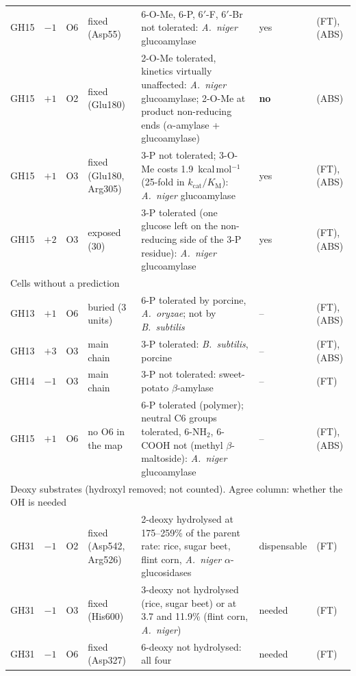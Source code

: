 \documentclass[preprint,12pt]{elsarticle}
\begin{document}
\begin{landscape}
{\begin{longtable}{lllp{3.3cm}p{6.8cm}lp{3.8cm}}
GH15 & $-1$ & O6 & fixed (Asp55) & 6-O-Me, 6-P, 6$'$-F, 6$'$-Br not tolerated: \emph{A.~niger} glucoamylase & yes & \citep{Takeda1987,Bock1988} (FT), \citep{Lemieux1996,Abe1982} (ABS)\\
GH15 & $+1$ & O2 & fixed (Glu180) & 2-O-Me tolerated, kinetics virtually unaffected: \emph{A.~niger} glucoamylase; 2-O-Me at product non-reducing ends ($\alpha$-amylase + glucoamylase) & \textbf{no} & \citep{Lemieux1996,Mischnick2001} (ABS)\\
GH15 & $+1$ & O3 & fixed (Glu180, Arg305) & 3-P not tolerated; 3-O-Me costs 1.9~kcal\,mol$^{-1}$ (25-fold in $k_\mathrm{cat}/K_\mathrm{M}$): \emph{A.~niger} glucoamylase & yes & \citep{Takeda1987} (FT), \citep{Takeda1983,Kamasaka1997,Lemieux1996} (ABS)\\
GH15 & $+2$ & O3 & exposed (30) & 3-P tolerated (one glucose left on the non-reducing side of the 3-P residue): \emph{A.~niger} glucoamylase & yes & \citep{Takeda1987} (FT), \citep{Takeda1983} (ABS)\\
\midrule
\multicolumn{7}{l}{Cells without a prediction}\\
GH13 & $+1$ & O6 & buried (3 units) & 6-P tolerated by porcine, \emph{A.~oryzae}; not by \emph{B.~subtilis} & -- & \citep{Takeda1987} (FT), \citep{Takeda1983} (ABS)\\
GH13 & $+3$ & O3 & main chain & 3-P tolerated: \emph{B.~subtilis}, porcine & -- & \citep{Takeda1987} (FT), \citep{Takeda1983} (ABS)\\
GH14 & $-1$ & O3 & main chain & 3-P not tolerated: sweet-potato $\beta$-amylase & -- & \citep{Takeda1987} (FT)\\
GH15 & $+1$ & O6 & no O6 in the map & 6-P tolerated (polymer); neutral C6 groups tolerated, 6-NH$_2$, 6-COOH not (methyl $\beta$-maltoside): \emph{A.~niger} glucoamylase & -- & \citep{Takeda1987,Bock1988} (FT), \citep{Takeda1983,Abe1982} (ABS)\\
\midrule
\multicolumn{7}{l}{Deoxy substrates (hydroxyl removed; not counted). Agree column: whether the OH is needed}\\
GH31 & $-1$ & O2 & fixed (Asp542, Arg526) & 2-deoxy hydrolysed at 175--259\% of the parent rate: rice, sugar beet, flint corn, \emph{A.~niger} $\alpha$-glucosidases & dispensable & \citep{Nishio2002,Ogawa2004} (FT)\\
GH31 & $-1$ & O3 & fixed (His600) & 3-deoxy not hydrolysed (rice, sugar beet) or at 3.7 and 11.9\% (flint corn, \emph{A.~niger}) & needed & \citep{Nishio2002} (FT)\\
GH31 & $-1$ & O6 & fixed (Asp327) & 6-deoxy not hydrolysed: all four & needed & \citep{Nishio2002,Ogawa2004} (FT)\\

\end{longtable}}
\end{landscape}
\end{document}
